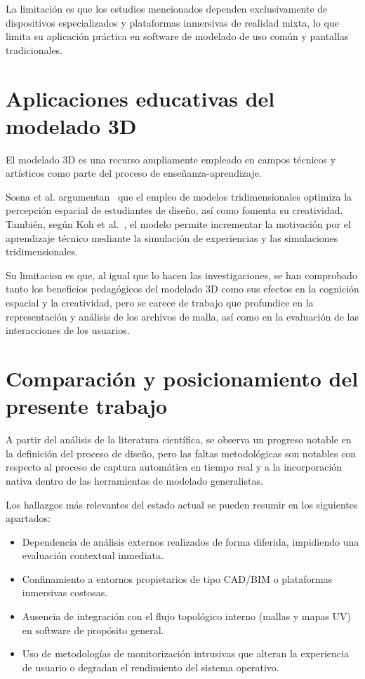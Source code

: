 La limitación es que los estudios mencionados dependen exclusivamente de dispositivos especializados y plataformas inmersivas de realidad mixta, lo que limita su aplicación práctica en software de modelado de uso común y pantallas tradicionales.

\section{Aplicaciones educativas del modelado 3D}

El modelado 3D es una recurso ampliamente empleado en campos técnicos y artísticos como parte del proceso de enseñanza-aprendizaje.

Sosna et al. argumentan~\cite{sosna2025} que el empleo de modelos tridimensionales optimiza la percepción espacial de estudiantes de diseño, así como fomenta su creatividad. También, según Koh et al.~\cite{koh2010}, el modelo permite incrementar la motivación por el aprendizaje técnico mediante la simulación de experiencias y las simulaciones tridimensionales.

Su limitacion es que, al igual que lo hacen las investigaciones, se han comprobado tanto los beneficios pedagógicos del modelado 3D como sus efectos en la cognición espacial y la creatividad, pero se carece de trabajo que profundice en la representación y análisis de los archivos de malla, así como en la evaluación de las interacciones de los usuarios.

\section{Comparación y posicionamiento del presente trabajo}

A partir del análisis de la literatura científica, se observa un progreso notable en la definición del proceso de diseño, pero las faltas metodológicas son notables con respecto al proceso de captura automática en tiempo real y a la incorporación nativa dentro de las herramientas de modelado generalistas.

Los hallazgos más relevantes del estado actual se pueden resumir en los siguientes apartados:
\begin{itemize}
    \item Dependencia de análisis externos realizados de forma diferida, impidiendo una evaluación contextual inmediata.
    \item Confinamiento a entornos propietarios de tipo CAD/BIM o plataformas inmersivas costosas.
    \item Ausencia de integración con el flujo topológico interno (mallas y mapas UV) en software de propósito general.
    \item Uso de metodologías de monitorización intrusivas que alteran la experiencia de usuario o degradan el rendimiento del sistema operativo.
\end{itemize}

